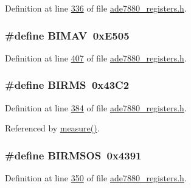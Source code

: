 Definition at line \hyperlink{a00036_source_l00336}{336} of file \hyperlink{a00036_source}{ade7880\-\_\-registers.\-h}.

\hypertarget{a00036_a5f9cd7017c3ef1233944970c850aaa00}{
\subsubsection[{B\-I\-M\-A\-V}]{\setlength{\rightskip}{0pt plus 5cm}\#define B\-I\-M\-A\-V~0x\-E505}}\label{de/d8c/a00036_a5f9cd7017c3ef1233944970c850aaa00}


Definition at line \hyperlink{a00036_source_l00407}{407} of file \hyperlink{a00036_source}{ade7880\-\_\-registers.\-h}.

\hypertarget{a00036_ae1cff66a3f5c466b4344a5c2781224df}{
\subsubsection[{B\-I\-R\-M\-S}]{\setlength{\rightskip}{0pt plus 5cm}\#define B\-I\-R\-M\-S~0x43\-C2}}\label{de/d8c/a00036_ae1cff66a3f5c466b4344a5c2781224df}


Definition at line \hyperlink{a00036_source_l00384}{384} of file \hyperlink{a00036_source}{ade7880\-\_\-registers.\-h}.



Referenced by \hyperlink{a00042_source_l00040}{measure()}.

\hypertarget{a00036_a12ec7e610dfabea2ef50a9078a6f48eb}{
\subsubsection[{B\-I\-R\-M\-S\-O\-S}]{\setlength{\rightskip}{0pt plus 5cm}\#define B\-I\-R\-M\-S\-O\-S~0x4391}}\label{de/d8c/a00036_a12ec7e610dfabea2ef50a9078a6f48eb}


Definition at line \hyperlink{a00036_source_l00350}{350} of file \hyperlink{a00036_source}{ade7880\-\_\-registers.\-h}.


